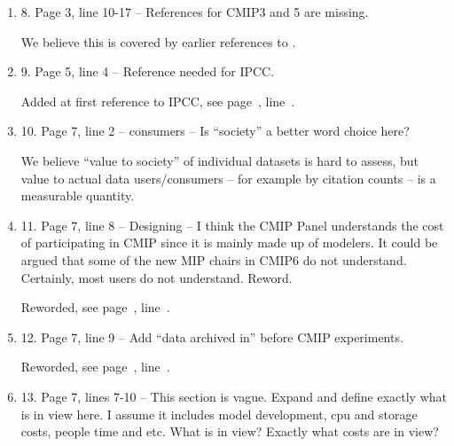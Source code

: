 \documentclass[gmd,manuscript]{copernicus}
\newcommand{\plref}[1]{see page~\pageref{p-#1}, line~\lineref{l-#1}.}
\newenvironment{answer}{\color{blue}}{}
\begin{document}
\begin{enumerate}[label=RC1-\arabic*,leftmargin=*]
  \begin{answer}
    Agreed. We note 2 new MIPs have been added since the first draft
    of this paper, as well as the canonical citation for CMIP6,
    \cite{ref:eyringetal2016a}, which is used in the text. The new
    wording reflects this evolution, \plref{RC1-7}
  \end{answer}
\item 8. Page 3, line 10-17 -- References for CMIP3 and 5 are missing.

  \begin{answer}
    We believe this is covered by earlier references to
    \cite{ref:eyringetal2016a}.
  \end{answer}
\item 9. Page 5, line 4 -- Reference needed for IPCC.

  \begin{answer}
    Added at first reference to IPCC, \plref{RC1-9}
  \end{answer}
\item 10. Page 7, line 2 -- consumers -- Is “society” a better word
  choice here?

  \begin{answer}
    We believe ``value to society'' of individual datasets is hard to
    assess, but value to actual data users/consumers -- for example by
    citation counts -- is a measurable quantity.
  \end{answer}
  
\item 11. Page 7, line 8 -- Designing -- I think the CMIP Panel
  understands the cost of participating in CMIP since it is mainly
  made up of modelers. It could be argued that some of the new MIP
  chairs in CMIP6 do not understand. Certainly, most users do not
  understand. Reword.

  \begin{answer}
    Reworded, \plref{RC1-11}
  \end{answer}
\item 12. Page 7, line 9 -- Add “data archived in” before CMIP
  experiments.

  \begin{answer}
    Reworded, \plref{RC1-12}
  \end{answer}
\item 13. Page 7, lines 7-10 -- This section is vague. Expand and
  define exactly what is in view here. I assume it includes model
  development, cpu and storage costs, people time and etc. What is in
  view? Exactly what costs are in view?


\end{enumerate}
\end{document}
